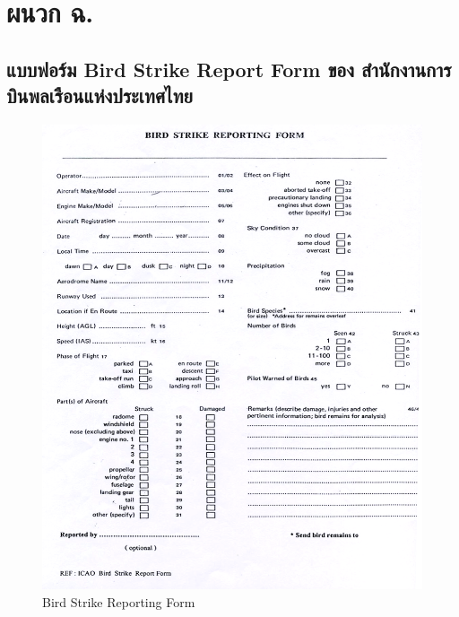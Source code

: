 
\chapter{ผนวก ฉ.}\label{ผนวก ฉ.}

\section{แบบฟอร์ม Bird Strike Report Form ของ สำนักงานการบินพลเรือนแห่งประเทศไทย}\label{แบบฟอร์ม Bird Strike Report Form ของ สำนักงานการบินพลเรือนแห่งประเทศไทย}

\begin{figure}[ht]
\begin{center}
\includegraphics[width=\linewidth]{images/Bird_Strike_Report_Form.png}
\caption{Bird Strike Reporting Form}
\label{Bird Strike Reporting Form}
\end{center}
\end{figure}